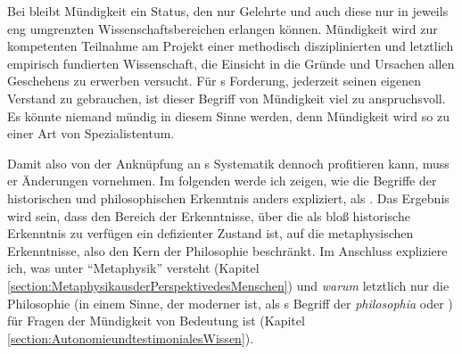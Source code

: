 Bei  bleibt
Mündigkeit ein Status, den nur Gelehrte und auch diese nur in jeweils eng
umgrenzten Wissenschaftsbereichen erlangen können. Mündigkeit wird zur
kompetenten Teilnahme am Projekt einer methodisch disziplinierten und letztlich
empirisch fundierten Wissenschaft, die Einsicht in die Gründe und Ursachen allen
Geschehens zu erwerben versucht. Für s Forderung, jederzeit
seinen eigenen Verstand zu gebrauchen, ist dieser Begriff von Mündigkeit viel zu
anspruchsvoll. Es könnte niemand mündig in diesem Sinne werden, denn Mündigkeit
wird so zu einer Art von Spezialistentum.

Damit  also von der Anknüpfung an
s Systematik
dennoch profitieren kann, muss er Änderungen vornehmen. Im folgenden werde ich
zeigen, wie  die Begriffe der historischen und
philosophischen Erkenntnis anders expliziert, als
. Das Ergebnis
wird sein, dass  den Bereich der Erkenntnisse, über die als
bloß historische Erkenntnis zu verfügen ein defizienter Zustand ist, auf die
metaphysischen Erkenntnisse, also den Kern der Philosophie beschränkt. Im
Anschluss expliziere ich, was  unter \enquote{Metaphysik}
versteht (Kapitel \ref{section:MetaphysikausderPerspektivedesMenschen}) und
\emph{warum} letztlich nur die Philosophie (in einem Sinne, der moderner ist,
als s Begriff der
\emph{philosophia} oder ) für Fragen der Mündigkeit
von Bedeutung ist (Kapitel \ref{section:AutonomieundtestimonialesWissen}).

